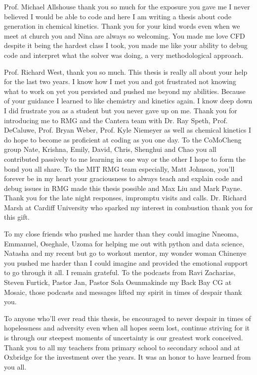 Prof. Michael Allshouse thank you so much for the exposure you gave me I never believed I would be able to code and here I am writing a thesis about code generation in chemical kinetics. Thank you for your kind words even when we meet at church you and Nina are always so welcoming. You made me love CFD despite it being the hardest class I took, you made me like your ability to debug code and interpret what the solver was doing, a very methodological approach. 

Prof. Richard West, thank you so much. This thesis is really all about your help for the last two years. I know how I met you and got frustrated not knowing what to work on yet you persisted and pushed me beyond my abilities. Because of your guidance I learned to like chemistry and kinetics again. I know deep down I did frustrate you as a student but you never gave up on me. Thank you for introducing me to RMG and the Cantera team with Dr. Ray Speth, Prof. DeCaluwe, Prof. Bryan Weber, Prof. Kyle Niemeyer as well as chemical kinetics I do hope to become as proficient at coding as you one day. To the CoMoCheng group Nate, Krishna, Emily, David, Chris, Shenghui and Chao you all contributed passively to me learning in one way or the other I hope to form the bond you all share. To the MIT RMG team especially, Matt Johnson, you'll forever be in my heart your graciousness to always teach and explain code and debug issues in RMG made this thesis possible and Max Liu and Mark Payne. Thank you for the late night responses, impromptu visits and calls. Dr. Richard Marsh at Cardiff University who sparked my interest in combustion thank you for this gift.

To my close friends who pushed me harder than they could imagine Nneoma, Emmanuel, Oseghale, Uzoma for helping me out with python and data science, Natasha and my recent but go to workout mentor, my wonder woman Chinenye you pushed me harder than I could imagine and provided the emotional support to go through it all. I remain grateful. To the podcasts from Ravi Zacharias, Steven Furtick, Pastor Jan, Pastor Sola Osunmakinde my Back Bay CG at Mosaic, those podcasts and messages lifted my spirit in times of despair thank you. 

To anyone who'll ever read this thesis, be encouraged to never despair in times of hopelessness and adversity even when all hopes seem lost, continue striving for it is through our steepest moments of uncertainty is our greatest work conceived. Thank you to all my teachers from primary school to secondary school and at Oxbridge for the investment over the years. It was an honor to have learned from you all.